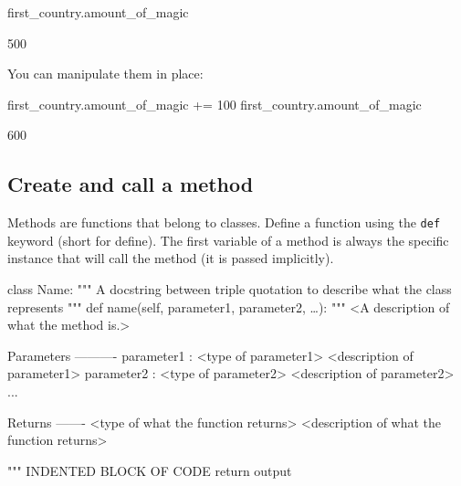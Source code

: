 \begin{pyin}
first_country.amount_of_magic
\end{pyin}





\begin{raw}
500
\end{raw}





You can manipulate them in place:




\begin{pyin}
first_country.amount_of_magic += 100
first_country.amount_of_magic
\end{pyin}





\begin{raw}
600
\end{raw}





\subsection{Create and call a method}
\label{\detokenize{building-tools/03-objects/how/main:how-to-create-and-call-a-method}}

Methods are functions that belong to classes. Define a function using the
\texttt{def} keyword (short for define). The first variable of a method is always the
specific instance that will call the method (it is passed implicitly).


\begin{pyin}
class Name:
    """
    A docstring between triple quotation to describe what the class represents
    """
    def name(self, parameter1, parameter2, …):
        """
        <A description of what the method is.>

        Parameters
        ----------
        parameter1 : <type of parameter1>
            <description of parameter1>
        parameter2 : <type of parameter2>
            <description of parameter2>
        ...

        Returns
        -------
        <type of what the function returns>
            <description of what the function returns>

        """
        INDENTED BLOCK OF CODE
        return output
\end{pyin}



